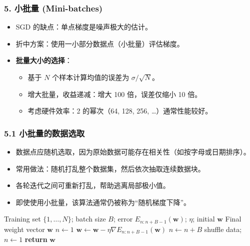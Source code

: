 \documentclass[t,aspectratio=169]{beamer} %
\begin{document}
\begin{frame}
    \frametitle{5. 小批量 (Mini-batches)}
    \begin{itemize}
        \item SGD 的缺点：单点梯度是\alert{噪声极大的估计}。
        \item 折中方案：使用一小部分数据点（\alert{小批量}）评估梯度。
        \item \textbf{批量大小的选择}：
        \begin{itemize}
            \item 基于 $N$ 个样本计算均值的误差为 $\sigma/\sqrt{N}$。
            \item 增大批量，收益\alert{递减}：增大 100 倍，误差仅缩小 10 倍。
            \item 考虑硬件效率：2 的幂次（64, 128, 256, \dots）通常性能较好。
        \end{itemize}
    \end{itemize}
\end{frame}

\begin{frame}[allowframebreaks]
    \frametitle{5.1 小批量的数据选取}
    \begin{itemize}
        \item 数据点应\alert{随机选取}，因为原始数据可能存在相关性（如按字母或日期排序）。
        \item 常用做法：\alert{随机打乱}整个数据集，然后依次抽取连续数据块。
        \item 各轮迭代之间可\alert{重新打乱}，帮助逃离局部极小值。
        \item 即使使用小批量，该算法通常仍被称为“随机梯度下降”。
    \end{itemize}
    \vspace{0.3em}
    \begin{algorithm}[H]
    \caption{Mini-batch stochastic gradient descent}
    \begin{algorithmic}
    \Input Training set $\{1,\dots,N\}$; batch size $B$; error $E_{n:n+B-1}(\mathbf{w})$; $\eta$; initial $\mathbf{w}$
    \Output Final weight vector $\mathbf{w}$
    \State $n \leftarrow 1$
    \Repeat
      \State $\mathbf{w} \leftarrow \mathbf{w} - \eta \nabla E_{n:n+B-1}(\mathbf{w})$ 
      \State $n \leftarrow n + B$ 
        \State shuffle data; $n \gets 1$
      \EndIf
    \State \textbf{return} $\mathbf{w}$
    \end{algorithmic}
    \end{algorithm}
\end{frame}
\end{document}
